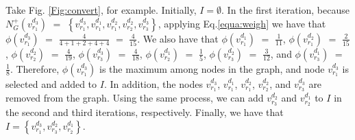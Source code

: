 Take Fig. \ref{Fig:convert}, for example. Initially, $I =
\emptyset$. In the first iteration, because
$N_{G}^{+}(v_{{{r}_{1}}}^{{{d}_{3}}})$ $=$ $\left\{
v_{{{r}_{1}}}^{{{d}_{3}}},v_{{{r}_{1}}}^{{{d}_{1}}},v_{{{r}_{1}}}^{{{d}_{2}}},
v_{{{r}_{2}}}^{{{d}_{2}}},v_{{{r}_{3}}}^{{{d}_{3}}} \right\}$,
applying Eq.\ref{equa:weigh} we have that
$\phi(v_{{r}_{1}}^{{{d}_{3}}})$  $=$ $\frac{4}{4+1+2+4+4}$ $=$
$\frac{4}{15}$. We also have that $\phi(v_{{r}_{1}}^{{{d}_{1}}})$
$=$ $\frac{1}{11}$, $\phi(v_{{r}_{1}}^{{{d}_{2}}})$  $=$
$\frac{2}{15}$, $\phi(v_{{r}_{2}}^{{{d}_{2}}})$  $=$ $\frac{4}{19}$,
$\phi(v_{{r}_{3}}^{{{d}_{3}}})$  $=$ $\frac{4}{18}$,
$\phi(v_{{r}_{2}}^{{{d}_{1}}})$  $=$ $\frac{1}{5}$,
$\phi(v_{{r}_{3}}^{{{d}_{2}}})$  $=$ $\frac{3}{12}$, and
$\phi(v_{{r}_{3}}^{{{d}_{1}}})$  $=$ $\frac{1}{8}$. Therefore,
$\phi(v_{{r}_{1}}^{{{d}_{3}}})$ is the maximum among nodes in the
graph, and node $v_{{r}_{1}}^{{{d}_{3}}}$ is selected and added to
$I$. In addition, the nodes $v_{{r}_{1}}^{{{d}_{3}}}$,
$v_{{{r}_{1}}}^{{{d}_{1}}}$, $v_{{{r}_{1}}}^{{{d}_{2}}}$,
$v_{{{r}_{2}}}^{{{d}_{2}}}$, and $v_{{{r}_{3}}}^{{{d}_{3}}}$ are
removed from the graph. Using the same process, we can add
$v_{{{r}_{3}}}^{{{d}_{2}}}$ and $v_{{{r}_{2}}}^{{{d}_{1}}}$ to $I$
in the second and third iterations, respectively. Finally, we have
that $I=\left\{
v_{{{r}_{1}}}^{{{d}_{3}}},v_{{{r}_{3}}}^{{{d}_{2}}},v_{{{r}_{2}}}^{{{d}_{1}}}
\right\}$. 